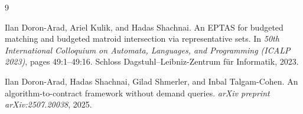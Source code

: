 \documentclass{article}
\begin{document}
\begin{thebibliography}{9}

Ilan Doron-Arad, Ariel Kulik, and Hadas Shachnai.
\newblock An EPTAS for budgeted matching and budgeted matroid intersection via representative sets.
\newblock In \emph{50th International Colloquium on Automata, Languages, and Programming (ICALP 2023)}, pages 49:1--49:16. Schloss Dagstuhl--Leibniz-Zentrum f\"ur Informatik, 2023.

Ilan Doron-Arad, Hadas Shachnai, Gilad Shmerler, and Inbal Talgam-Cohen.
\newblock An algorithm-to-contract framework without demand queries.
\newblock \emph{arXiv preprint arXiv:2507.20038}, 2025.

\end{thebibliography}
\end{document}
